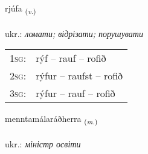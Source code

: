 \documentclass[frontgrid, backgrid]{flacards}\usepackage[]{graphicx}\usepackage[]{xcolor}
\begin{document}
\renewcommand{\flhead}{\vskip5pt \fboxsep=0pt {\small\bfseries\footnotesize Sagnorð | дієслово}}
\renewcommand{\fcfoot}{\vskip5pt \fboxsep=0pt \hspace{2pt}{\small\bfseries\footnotesize 3K}}

\renewcommand{\blhead}{\vskip5pt {\small\bfseries\footnotesize Sagnorð | дієслово }}
\renewcommand{\bcfoot}{\vskip5pt \hspace{2pt}{\small\bfseries\footnotesize 3K}}


{rjúfa \small{\textsubscript{(\textit{v.})}} \\[1ex] %
\textphonetic{[rjuːva]} \\
ukr.: \emph{ломати; відрізати; порушувати} \\  [2ex]
\renewcommand*{\arraystretch}{0.8}
\begin{tabular}{p{1cm}l}
\textsc{1sg}: & rýf -- rauf -- rofið \\ 
\textsc{2sg}: & rýfur -- raufst -- rofið \\ 
\textsc{3sg}: & rýfur -- rauf -- rofið \\ 
\end{tabular}
}

\renewcommand{\flhead}{\vskip5pt \fboxsep=0pt {\small\bfseries\footnotesize Nafnorð | іменник}}
\renewcommand{\fcfoot}{\vskip5pt \fboxsep=0pt \hspace{2pt}{\small\bfseries\footnotesize 3K}}

\renewcommand{\blhead}{\vskip5pt {\small\bfseries\footnotesize Nafnorð | іменник }}
\renewcommand{\bcfoot}{\vskip5pt \hspace{2pt}{\small\bfseries\footnotesize 3K}}


{menntamálaráðherra \small{\textsubscript{(\textit{m.})}} \\[1ex] %
 \\
ukr.: \emph{міністр освіти} \\  [2ex]
\renewcommand*{\arraystretch}{0.8}
}
\end{document}
